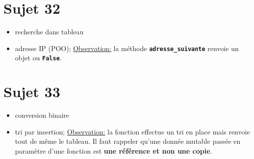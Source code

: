 \documentclass[a4paper,11pt]{article}
\begin{document}
\section{Sujet 32}
\begin{itemize}
    \item recherche dans tableau
    \item adresse IP (POO); \underline{Observation:} la méthode \textbf{\texttt{adresse\_suivante}} renvoie un objet ou \textbf{\texttt{False}}.
\end{itemize}
\section{Sujet 33}
\begin{itemize}
    \item conversion binaire
    \item tri par insertion; \underline{Observation:} la fonction effectue un tri en place mais renvoie tout de même le tableau. Il faut rappeler qu'une donnée mutable passée en paramètre d'une fonction est \textbf{une référence et non une copie}.
\end{itemize}
\end{document}

